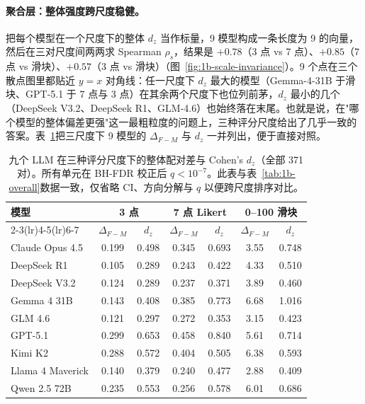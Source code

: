 \documentclass[UTF8,12pt]{ctexart}
\begin{document}
\paragraph{聚合层：整体强度跨尺度稳健。}
把每个模型在一个尺度下的整体 $d_z$ 当作标量，9 模型构成一条长度为 9 的向量，然后在三对尺度间两两求 Spearman $\rho_s$，结果是 $+0.78$（3 点 vs 7 点）、$+0.85$（7 点 vs 滑块）、$+0.57$（3 点 vs 滑块）（图~\ref{fig:1b-scale-invariance}）。9 个点在三个散点图里都贴近 $y=x$ 对角线：任一尺度下 $d_z$ 最大的模型（Gemma-4-31B 于滑块、GPT-5.1 于 7 点与 3 点）在其余两个尺度下也位列前茅，$d_z$ 最小的几个（DeepSeek V3.2、DeepSeek R1、GLM-4.6）也始终落在末尾。也就是说，在"哪个模型的整体偏差更强"这一最粗粒度的问题上，三种评分尺度给出了几乎一致的答案。表~\ref{tab:1b-scale-invariance}把三尺度下 9 模型的 $\Delta_{F-M}$ 与 $d_z$ 一并列出，便于直接对照。

\begin{table}[htbp]
    \centering
    \caption{九个 LLM 在三种评分尺度下的整体配对差与 Cohen's $d_z$（全部 371 对）。所有单元在 BH-FDR 校正后 $q < 10^{-7}$。此表与表~\ref{tab:1b-overall}数据一致，仅省略 CI、方向分解与 $q$ 以便跨尺度排序对比。}
    \label{tab:1b-scale-invariance}
    \footnotesize
    \setlength{\tabcolsep}{4pt}
    \begin{tabular}{lcccccc}
        \toprule
        模型 & \multicolumn{2}{c}{3 点} & \multicolumn{2}{c}{7 点 Likert} & \multicolumn{2}{c}{0--100 滑块} \\
        \cmidrule(lr){2-3}\cmidrule(lr){4-5}\cmidrule(lr){6-7}
         & $\Delta_{F-M}$ & $d_z$ & $\Delta_{F-M}$ & $d_z$ & $\Delta_{F-M}$ & $d_z$ \\
        \midrule
        Claude Opus 4.5   & 0.199 & 0.498 & 0.345 & 0.693 & 3.55 & 0.748 \\
        DeepSeek R1       & 0.105 & 0.289 & 0.243 & 0.422 & 4.33 & 0.510 \\
        DeepSeek V3.2     & 0.124 & 0.289 & 0.237 & 0.371 & 3.89 & 0.460 \\
        Gemma 4 31B       & 0.143 & 0.408 & 0.385 & 0.773 & 6.68 & 1.016 \\
        GLM 4.6           & 0.121 & 0.297 & 0.272 & 0.353 & 3.15 & 0.423 \\
        GPT-5.1           & 0.299 & 0.653 & 0.458 & 0.840 & 5.61 & 0.714 \\
        Kimi K2           & 0.288 & 0.572 & 0.404 & 0.505 & 6.38 & 0.593 \\
        Llama 4 Maverick  & 0.140 & 0.379 & 0.240 & 0.477 & 2.88 & 0.409 \\
        Qwen 2.5 72B      & 0.235 & 0.553 & 0.256 & 0.578 & 6.01 & 0.686 \\
        \bottomrule
    \end{tabular}
\end{table}
\end{document}
